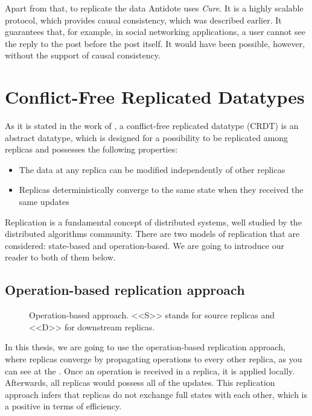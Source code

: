Apart from that, to replicate the data Antidote uses \textit{Cure}\cite{15}. It is a highly scalable protocol, which provides causal consistency, which was described earlier. It guarantees that, for example, in social networking applications, a user cannot see the reply to the post before the post itself. It would have been possible, however, without the support of causal consistency. 

\section{Conflict-Free Replicated Datatypes}

As it is stated in the work of \citet{3}, a conflict-free replicated datatype (CRDT) is an abstract datatype, which is designed for a possibility to be replicated among replicas and possesses the following properties:


    \begin{itemize}
        \item {The data at any replica can be modified independently of other replicas}
        \item {Replicas deterministically converge to the same state when they received the same updates}
    \end{itemize}

Replication is a fundamental concept of distributed systems, well studied by the distributed algorithms community\cite{2}. There are two models of replication that are considered: state-based and operation-based. We are going to introduce our reader to both of them below. 

\subsection*{Operation-based replication approach}

\begin{figure}[!htb]
    \begin{center}
    \def\svgwidth{\linewidth}
    
    \caption {Operation-based approach\cite{2}. <<S>> stands for source replicas and <<D>> for downstream replicas. }
    \label{fig:theory1}
\end{center}
\end{figure}



In this thesis, we are going to use the operation-based replication approach, where replicas converge by propagating operations to every other replica\cite{3}, as you can see at the . Once an operation is received in a replica, it is applied locally. Afterwards, all replicas would possess all of the updates. This replication approach infers that replicas do not exchange full states with each other, which is a positive in terms of efficiency.

